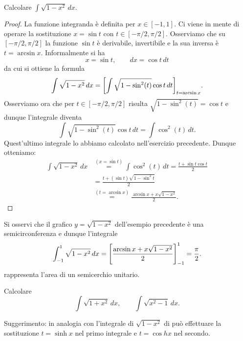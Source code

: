 \begin{example}
Calcolare
$\int \sqrt{1-x^2}\, dx$.
\end{example}
\begin{proof}
La funzione integranda è definita per $x\in [-1,1]$.
Ci viene in mente di operare la sostituzione $x=\sin t$
con $t\in [-\pi/2, \pi/2]$.
Osserviamo che su $[-\pi/2,\pi/2]$ la funzione $\sin t$ è derivabile,
invertibile e la sua inversa è $t = \arcsin x$.
Informalmente si ha
\[
 x= \sin t, \qquad dx = \cos t \, dt
\]
da cui si ottiene la formula
\[
 \int \sqrt{1-x^2}\, dx = {\left[ \int \sqrt{1-\sin^2(t)} \cos t\, dt \right]}_{t=\arcsin x}.
\]
Osserviamo ora che per $t\in [-\pi/2, \pi/2]$ risulta $\sqrt{1-\sin^2(t)}=\cos t$
e dunque l'integrale
diventa
\[
 \int \sqrt{1-\sin^2(t)}\cos t\, dt = \int \cos^2(t)\, dt.
\]
Quest'ultimo integrale lo abbiamo calcolato nell'esercizio precedente.
Dunque otteniamo:
\begin{align*}
 \int \sqrt{1-x^2}\, dx
 &\stackrel{(x=\sin t)}= \int \cos^2(t)\, dt
 = \frac{t + \sin t \cos t}{2} \\
 &= \frac{t + (\sin t) \sqrt{1-\sin^2 t}}{2} \\
 &\stackrel{(t=\arcsin x)}= \frac{\arcsin x + x \sqrt{1-x^2}}{2}.
\end{align*}
\end{proof}

Si osservi che il grafico $y=\sqrt{1-x^2}$ dell'esempio precedente
è una semicirconferenza e dunque l'integrale 
\[
 \int_{-1}^1 \sqrt{1-x^2}\, dx = {\left[ \frac{\arcsin x +x\sqrt{1-x^2}}{2} \right]}_{-1}^{1}
 = \frac{\pi}{2}.
\]
rappresenta l'area di un semicerchio unitario.

\begin{exercise}
Calcolare
\[
 \int \sqrt{1+x^2}\, dx, \qquad \int \sqrt{x^2-1}\, dx.  
\]

Suggerimento: in analogia con l'integrale di $\sqrt{1-x^2}$
di può effettuare la sostituzione $t=\sinh x$ nel primo 
integrale e $t=\cos h x$ nel secondo.
\end{exercise}

